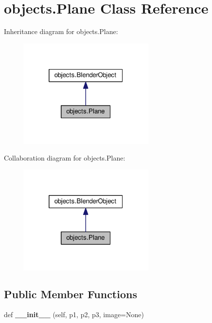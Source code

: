 \hypertarget{classobjects_1_1Plane}{}\section{objects.\+Plane Class Reference}
\label{classobjects_1_1Plane}


Inheritance diagram for objects.\+Plane\+:\nopagebreak
\begin{figure}[H]
\begin{center}
\leavevmode
\includegraphics[width=193pt]{classobjects_1_1Plane__inherit__graph}
\end{center}
\end{figure}


Collaboration diagram for objects.\+Plane\+:\nopagebreak
\begin{figure}[H]
\begin{center}
\leavevmode
\includegraphics[width=193pt]{classobjects_1_1Plane__coll__graph}
\end{center}
\end{figure}
\subsection*{Public Member Functions}
\begin{DoxyCompactItemize}
\item 
def {\bfseries \+\_\+\+\_\+init\+\_\+\+\_\+} (self, p1, p2, p3, image=None)\hypertarget{classobjects_1_1Plane_ae5f23748ecc242d85aaa78f64d90bf38}{}\label{classobjects_1_1Plane_ae5f23748ecc242d85aaa78f64d90bf38}

\end{DoxyCompactItemize}
